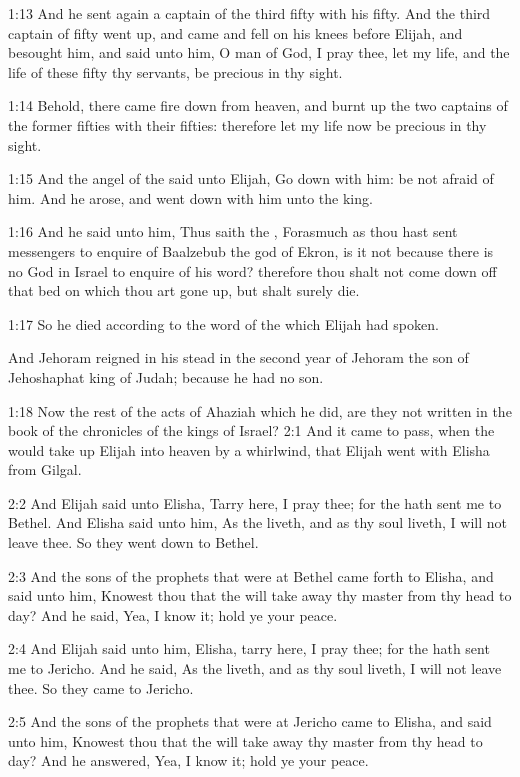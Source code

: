 1:13 And he sent again a captain of the third fifty with his fifty.  And the third captain of fifty went up, and came and fell on his knees before Elijah, and besought him, and said unto him, O man of God, I pray thee, let my life, and the life of these fifty thy servants, be precious in thy sight.

1:14 Behold, there came fire down from heaven, and burnt up the two captains of the former fifties with their fifties: therefore let my life now be precious in thy sight.

1:15 And the angel of the \LORD said unto Elijah, Go down with him: be not afraid of him. And he arose, and went down with him unto the king.

1:16 And he said unto him, Thus saith the \LORD, Forasmuch as thou hast sent messengers to enquire of Baalzebub the god of Ekron, is it not because there is no God in Israel to enquire of his word? therefore thou shalt not come down off that bed on which thou art gone up, but shalt surely die.

1:17 So he died according to the word of the \LORD which Elijah had spoken.

And Jehoram reigned in his stead in the second year of Jehoram the son of Jehoshaphat king of Judah; because he had no son.

1:18 Now the rest of the acts of Ahaziah which he did, are they not written in the book of the chronicles of the kings of Israel?  2:1 And it came to pass, when the \LORD would take up Elijah into heaven by a whirlwind, that Elijah went with Elisha from Gilgal.

2:2 And Elijah said unto Elisha, Tarry here, I pray thee; for the \LORD hath sent me to Bethel. And Elisha said unto him, As the \LORD liveth, and as thy soul liveth, I will not leave thee. So they went down to Bethel.

2:3 And the sons of the prophets that were at Bethel came forth to Elisha, and said unto him, Knowest thou that the \LORD will take away thy master from thy head to day? And he said, Yea, I know it; hold ye your peace.

2:4 And Elijah said unto him, Elisha, tarry here, I pray thee; for the \LORD hath sent me to Jericho. And he said, As the \LORD liveth, and as thy soul liveth, I will not leave thee. So they came to Jericho.

2:5 And the sons of the prophets that were at Jericho came to Elisha, and said unto him, Knowest thou that the \LORD will take away thy master from thy head to day? And he answered, Yea, I know it; hold ye your peace.

